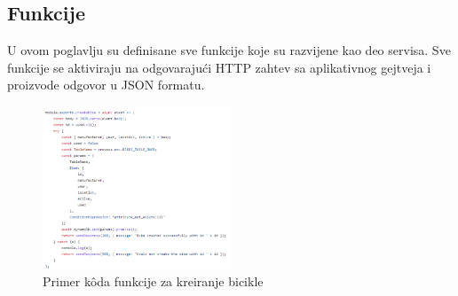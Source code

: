 \documentclass[12pt,oneside]{memoir}
\begin{document}
\subsection{Funkcije}
U ovom poglavlju su definisane sve funkcije koje su razvijene kao deo servisa. Sve funkcije se aktiviraju na odgovarajući HTTP zahtev sa aplikativnog gejtveja i proizvode odgovor u JSON formatu.

\begin{figure}[!ht]
  \centering
  \includegraphics[width=0.5\textwidth]{createBikeFunc.png}
  \caption{Primer kôda funkcije za kreiranje bicikle}
  \label{fig:createBikeFunc}
\end{figure}

\end{document}
